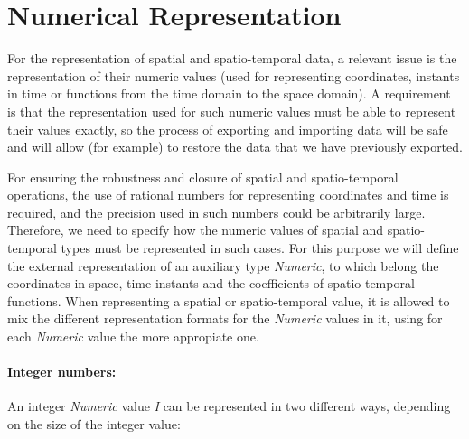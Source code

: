 \documentclass[english,a4paper]{article}
\begin{document}
\section{Numerical Representation}

For the representation of spatial and spatio-temporal data, a relevant
issue is the representation of their numeric values (used for representing
coordinates, instants in time or functions from the time domain to
the space domain). A requirement is that the representation used for
such numeric values must be able to represent their values exactly,
so the process of exporting and importing data will be safe and will
allow (for example) to restore the data that we have previously exported.

For ensuring the robustness and closure of spatial and spatio-temporal
operations, the use of rational numbers for representing coordinates
and time is required, and the precision used in such numbers could
be arbitrarily large. Therefore, we need to specify how the numeric
values of spatial and spatio-temporal types must be represented in
such cases. For this purpose we will define the external representation
of an auxiliary type \emph{Numeric}, to which belong the coordinates
in space, time instants and the coefficients of spatio-temporal functions.
When representing a spatial or spatio-temporal value, it is allowed
to mix the different representation formats for the \emph{Numeric}
values in it, using for each \emph{Numeric} value the more appropiate
one.


\paragraph{Integer numbers:}

An integer \emph{Numeric} value \emph{I} can be represented in two
different ways, depending on the size of the integer value:
\end{document}
